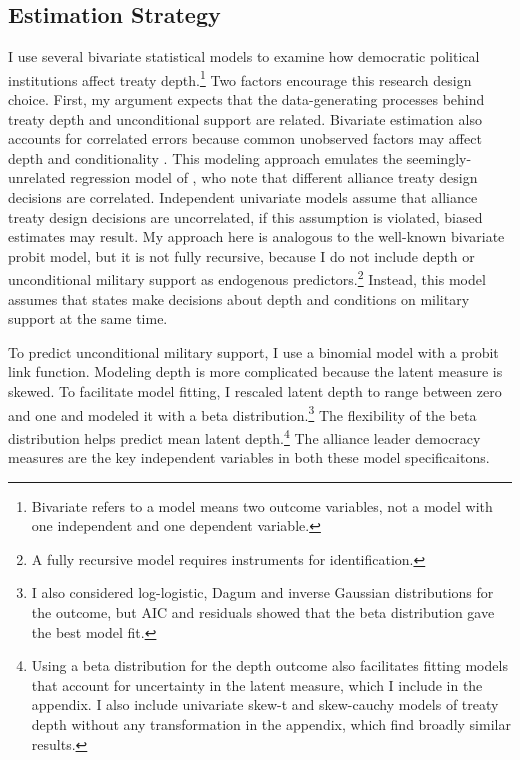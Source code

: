 \documentclass[12pt]{article}
\begin{document}
\subsection{Estimation Strategy}



I use several bivariate statistical models to examine how democratic political institutions affect treaty depth.\footnote{Bivariate refers to a model means two outcome variables, not a model with one independent and one dependent variable.} 
Two factors encourage this research design choice. 
First, my argument expects that the data-generating processes behind treaty depth and unconditional support are related. 
Bivariate estimation also accounts for correlated errors because common unobserved factors may affect depth and conditionality \citep{Braumoelleretal2018}.
This modeling approach emulates the seemingly-unrelated regression model of \citet{FjelstulReiter2019}, who note that different alliance treaty design decisions are correlated. 
Independent univariate models assume that alliance treaty design decisions are uncorrelated, if this assumption is violated, biased estimates may result. 
My approach here is analogous to the well-known bivariate probit model, but it is not fully recursive, because I do not include depth or unconditional military support as endogenous predictors.\footnote{A fully recursive model requires instruments for identification.}  
Instead, this model assumes that states make decisions about depth and conditions on military support at the same time. 


To predict unconditional military support, I use a binomial model with a probit link function. 
Modeling depth is more complicated because the latent measure is skewed.
To facilitate model fitting, I rescaled latent depth to range between zero and one and modeled it with a beta distribution.\footnote{I also considered log-logistic, Dagum and inverse Gaussian distributions for the outcome, but AIC and residuals showed that the beta distribution gave the best model fit.}
The flexibility of the beta distribution helps predict mean latent depth.\footnote{Using a beta distribution for the depth outcome also facilitates fitting models that account for uncertainty in the latent measure, which I include in the appendix. I also include univariate skew-t and skew-cauchy models of treaty depth without any transformation in the appendix, which find broadly similar results.} 
The alliance leader democracy measures are the key independent variables in both these model specificaitons. 
\end{document}
